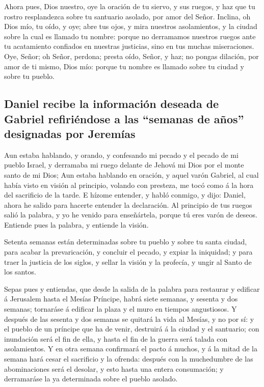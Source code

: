  Ahora pues, Dios nuestro, oye la oración de tu siervo, y
sus ruegos, y haz que tu rostro resplandezca sobre tu santuario asolado,
por amor del Señor.  Inclina, oh Dios mío, tu oído, y
oye; abre tus ojos, y mira nuestros asolamientos, y la ciudad sobre la
cual es llamado tu nombre: porque no derramamos nuestros ruegos ante tu
acatamiento confiados en nuestras justicias, sino en tus muchas
miseraciones.  Oye, Señor; oh Señor, perdona; presta
oído, Señor, y haz; no pongas dilación, por amor de ti mismo, Dios mío:
porque tu nombre es llamado sobre tu ciudad y sobre tu pueblo.

\hypertarget{daniel-recibe-la-informaciuxf3n-deseada-de-gabriel-refiriuxe9ndose-a-las-semanas-de-auxf1os-designadas-por-jeremuxedas}{%
\subsection{Daniel recibe la información deseada de Gabriel refiriéndose
a las ``semanas de años'' designadas por
Jeremías}\label{daniel-recibe-la-informaciuxf3n-deseada-de-gabriel-refiriuxe9ndose-a-las-semanas-de-auxf1os-designadas-por-jeremuxedas}}

 Aun estaba hablando, y orando, y confesando mi pecado y
el pecado de mi pueblo Israel, y derramaba mi ruego delante de Jehová mi
Dios por el monte santo de mi Dios;  Aun estaba hablando
en oración, y aquel varón Gabriel, al cual había visto en visión al
principio, volando con presteza, me tocó como á la hora del sacrificio
de la tarde.  E hízome entender, y habló conmigo, y dijo:
Daniel, ahora he salido para hacerte entender la declaración.
 Al principio de tus ruegos salió la palabra, y yo he
venido para enseñártela, porque tú eres varón de deseos. Entiende pues
la palabra, y entiende la visión.

 Setenta semanas están determinadas sobre tu pueblo y
sobre tu santa ciudad, para acabar la prevaricación, y concluir el
pecado, y expiar la iniquidad; y para traer la justicia de los siglos, y
sellar la visión y la profecía, y ungir al Santo de los santos.

 Sepas pues y entiendas, que desde la salida de la
palabra para restaurar y edificar á Jerusalem hasta el Mesías Príncipe,
habrá siete semanas, y sesenta y dos semanas; tornaráse á edificar la
plaza y el muro en tiempos angustiosos.  Y después de las
sesenta y dos semanas se quitará la vida al Mesías, y no por sí: y el
pueblo de un príncipe que ha de venir, destruirá á la ciudad y el
santuario; con inundación será el fin de ella, y hasta el fin de la
guerra será talada con asolamientos.  Y en otra semana
confirmará el pacto á muchos, y á la mitad de la semana hará cesar el
sacrificio y la ofrenda: después con la muchedumbre de las abominaciones
será el desolar, y esto hasta una entera consumación; y derramaráse la
ya determinada sobre el pueblo asolado.

